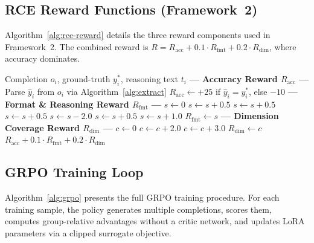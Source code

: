 \documentclass{article} %
\begin{document}
\subsection{RCE Reward Functions (Framework~2)}

Algorithm~\ref{alg:rce-reward} details the three reward components used in Framework~2. The combined reward is $R = R_{\text{acc}} + 0.1 \cdot R_{\text{fmt}} + 0.2 \cdot R_{\text{dim}}$, where accuracy dominates.

\begin{algorithm}[htbp]
\caption{RCE Reward Computation (Framework~2)}
\label{alg:rce-reward}
\begin{algorithmic}[1]
\REQUIRE Completion $o_i$, ground-truth $y^*_i$, reasoning text $t_i$
\STATE \textbf{--- Accuracy Reward $R_{\text{acc}}$ ---}
\STATE Parse $\hat{y}_i$ from $o_i$ via Algorithm~\ref{alg:extract}
\STATE $R_{\text{acc}} \leftarrow +25$ if $\hat{y}_i = y^*_i$, else $-10$
\STATE
\STATE \textbf{--- Format \& Reasoning Reward $R_{\text{fmt}}$ ---}
\STATE $s \leftarrow 0$
    \STATE $s \leftarrow s + 0.5$
\ENDIF
{}
    \STATE $s \leftarrow s + 0.5$
\ENDIF
{}
    \STATE $s \leftarrow s + 0.5$
\ENDIF
{}
    \STATE $s \leftarrow s - 2.0$
\ELSE
    \STATE $s \leftarrow s + 0.5$
\ENDIF
{}
    \STATE $s \leftarrow s + 1.0$
\ENDIF
\STATE $R_{\text{fmt}} \leftarrow s$
\STATE
\STATE \textbf{--- Dimension Coverage Reward $R_{\text{dim}}$ ---}
\STATE $c \leftarrow 0$
        \STATE $c \leftarrow c + 2.0$
    \ENDIF
\ENDFOR
{}
    \STATE $c \leftarrow c + 3.0$ 
\ENDIF
\STATE $R_{\text{dim}} \leftarrow c$
\STATE
\RETURN $R_{\text{acc}} + 0.1 \cdot R_{\text{fmt}} + 0.2 \cdot R_{\text{dim}}$
\end{algorithmic}
\end{algorithm}

\subsection{GRPO Training Loop}

Algorithm~\ref{alg:grpo} presents the full GRPO training procedure. For each training sample, the policy generates multiple completions, scores them, computes group-relative advantages without a critic network, and updates LoRA parameters via a clipped surrogate objective.
\end{document}
